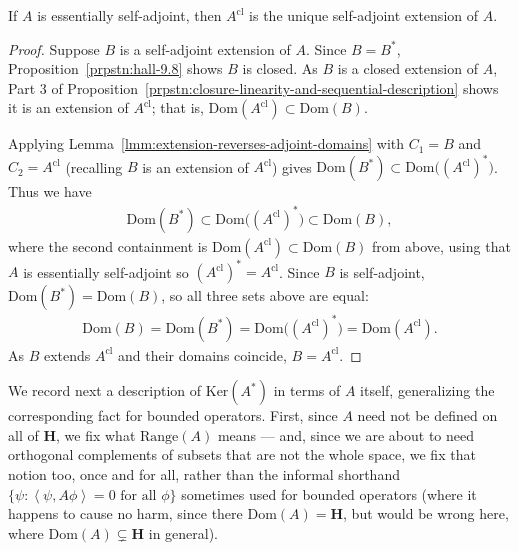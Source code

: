 \begin{proposition}
    \label{prpstn:hall-9.11}
    \leanok
    If $A$ is essentially self-adjoint, then $A^{\text{cl}}$ is the unique self-adjoint extension of $A$.
\end{proposition}
\begin{proof}
    \leanok
Suppose $B$ is a self-adjoint extension of $A$. Since $B = B^*$, Proposition~\ref{prpstn:hall-9.8} shows $B$ is closed. As $B$ is a closed extension of $A$, Part 3 of Proposition~\ref{prpstn:closure-linearity-and-sequential-description} shows it is an extension of $A^{\text{cl}}$; that is, $\text{Dom}(A^{\text{cl}}) \subset \text{Dom}(B)$.

Applying Lemma~\ref{lmm:extension-reverses-adjoint-domains} with $C_1 = B$ and $C_2 = A^{\text{cl}}$ (recalling $B$ is an extension of $A^{\text{cl}}$) gives $\text{Dom}(B^*) \subset \text{Dom}\big( (A^{\text{cl}})^* \big)$. Thus we have
\begin{align}
    \text{Dom}(B^*) \subset \text{Dom}\big( (A^{\text{cl}})^* \big) \subset \text{Dom}(B),
\end{align}
where the second containment is $\text{Dom}(A^{\text{cl}}) \subset \text{Dom}(B)$ from above, using that $A$ is essentially self-adjoint so $(A^{\text{cl}})^* = A^{\text{cl}}$. Since $B$ is self-adjoint, $\text{Dom}(B^*) = \text{Dom}(B)$, so all three sets above are equal:
\begin{align}
    \text{Dom}(B) = \text{Dom}(B^*) = \text{Dom}\big( (A^{\text{cl}})^* \big) = \text{Dom}(A^{\text{cl}}).
\end{align}
As $B$ extends $A^{\text{cl}}$ and their domains coincide, $B = A^{\text{cl}}$.
\end{proof}

We record next a description of $\text{Ker}(A^*)$ in terms of $A$ itself, generalizing the corresponding fact for bounded operators. First, since $A$ need not be defined on all of $\mathbf{H}$, we fix what $\text{Range}(A)$ means — and, since we are about to need orthogonal complements of subsets that are not the whole space, we fix that notion too, once and for all, rather than the informal shorthand $\{\psi : \left<\psi,A\phi\right>=0 \text{ for all } \phi\}$ sometimes used for bounded operators (where it happens to cause no harm, since there $\text{Dom}(A) = \mathbf{H}$, but would be wrong here, where $\text{Dom}(A) \subsetneq \mathbf{H}$ in general).

